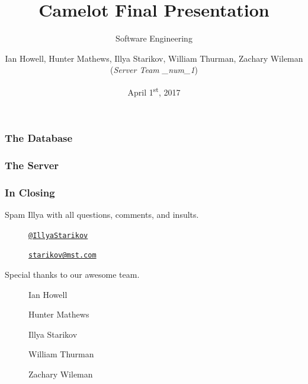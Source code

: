 \documentclass{beamer}
\title{Camelot Final Presentation}
\subtitle{Software Engineering}
\author{Ian Howell, Hunter Mathews, Illya Starikov, William Thurman, Zachary Wileman (\textit{Server Team \_num_1})}
\date{April 1\textsuperscript{st}, 2017}
\institute{Missouri University of Science and Technology}
\begin{document}
\begin{frame}
    \vfill
    \centering
\end{frame}

\begin{frame}
    \maketitle
\end{frame}

\begin{frame}
    \frametitle{The Database}
\end{frame}

\begin{frame}
    \frametitle{The Server}
\end{frame}


\begin{frame}
    \frametitle{In Closing}

    Spam Illya with all questions, comments, and insults.
    \begin{description}
        \item[\faGithub]  \href{https://github.com/IllyaStarikov}{\nolinkurl{@IllyaStarikov}}
        \item[\faComment] \href{mailto:starikov@mst.edu}{\nolinkurl{starikov@mst.com}}
    \end{description}

    Special thanks to our awesome team.
    \begin{description}
        \item[\faUser] Ian Howell
        \item[\faUser] Hunter Mathews
        \item[\faUser] Illya Starikov
        \item[\faUser] William Thurman
        \item[\faUser] Zachary Wileman
    \end{description}
\end{frame}
\end{document}
